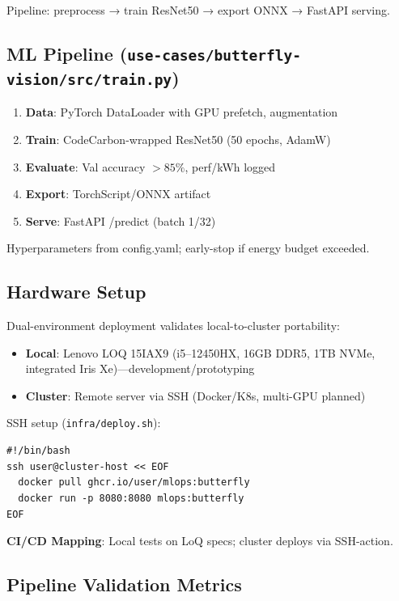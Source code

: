 Pipeline: preprocess → train ResNet50 → export ONNX → FastAPI serving.

\subsection{ML Pipeline (\texttt{use-cases/butterfly-vision/src/train.py})}

\begin{enumerate}
    \item \textbf{Data}: PyTorch DataLoader with GPU prefetch, augmentation
    \item \textbf{Train}: CodeCarbon-wrapped ResNet50 (50 epochs, AdamW)
    \item \textbf{Evaluate}: Val accuracy $>85\%$, perf/kWh logged
    \item \textbf{Export}: TorchScript/ONNX artifact
    \item \textbf{Serve}: FastAPI /predict (batch 1/32)
\end{enumerate}

Hyperparameters from config.yaml; early-stop if energy budget exceeded.

\subsection{Hardware Setup}

Dual-environment deployment validates local-to-cluster portability:

\begin{itemize}
    \item \textbf{Local}: Lenovo LOQ 15IAX9 (i5--12450HX, 16GB DDR5, 1TB NVMe, integrated Iris Xe)—development/prototyping
    \item \textbf{Cluster}: Remote server via SSH (Docker/K8s, multi-GPU planned)
\end{itemize}

SSH setup (\texttt{infra/deploy.sh}):

\begin{verbatim}
#!/bin/bash
ssh user@cluster-host << EOF
  docker pull ghcr.io/user/mlops:butterfly
  docker run -p 8080:8080 mlops:butterfly
EOF
\end{verbatim}

\textbf{CI/CD Mapping}: Local tests on LoQ specs; cluster deploys via SSH-action.

\subsection{Pipeline Validation Metrics}

